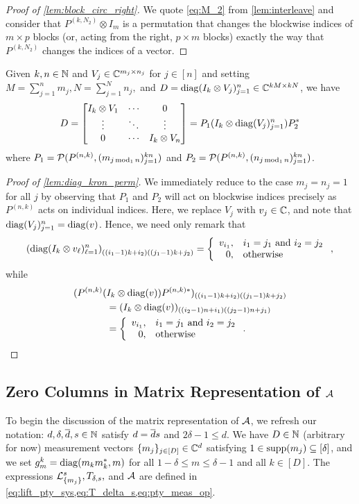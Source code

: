 \begin{proof}[Proof of \cref{lem:block_circ_right}]
  We quote \eqref{eq:M_2} from \cref{lem:interleave} and consider that $P^{(k, N_2)} \otimes I_m$ is a permutation that changes the blockwise indices of $m \times p$ blocks (or, acting from the right, $p \times m$ blocks) exactly the way that $P^{(k, N_2)}$ changes the indices of a vector.
\end{proof}

\begin{lemma} \label{lem:diag_kron_perm}
  Given $k, n \in \mathbb{N}$ and $V_j \in \mathbb{C}^{m_j \times n_j}$ for $j \in [n]$ and setting $M = \sum_{j = 1}^n m_j, N = \sum_{j = 1}^N n_j,$ and $D = \operatorname{diag}(I_k \otimes V_j)_{j = 1}^n \in \mathbb{C}^{k M \times k N}$, we have \[D =  \begin{bmatrix} I_k \otimes V_1 & \cdots & 0 \\ \vdots & \ddots & \vdots \\ 0 & \cdots & I_k \otimes V_n \end{bmatrix}  = P_1 (I_k \otimes \operatorname{diag}(V_j)_{j = 1}^n) P_2^*\] where $P_1 = \mathcal{P}(P^{(n, k)}, (m_{j \operatorname{\mathbin{mod}}_1 n})_{j = 1}^{kn})$ and $P_2 = \mathcal{P}(P^{(n, k)}, (n_{j \operatorname{\mathbin{mod}}_1 n})_{j = 1}^{kn})$.
\end{lemma}

\begin{proof}[Proof of \cref{lem:diag_kron_perm}]
  We immediately reduce to the case $m_j = n_j = 1$ for all $j$ by observing that $P_1$ and $P_2$ will act on blockwise indices precisely as $P^{(n, k)}$ acts on individual indices.  Here, we replace $V_j$ with $v_j \in \mathbb{C}$, and note that $\operatorname{diag}(V_j)_{j = 1}^n = \operatorname{diag}(v)$.  Hence, we need only remark that \[\left(\diag(I_k \otimes v_\ell)_{\ell = 1}^n\right)_{((i_1 - 1)k + i_2) ((j_1 - 1)k + j_2)} = \left\{\begin{array}{r@{,\quad}l} v_{i_1} & i_1 = j_1 \ \text{and} \ i_2 = j_2 \\ 0 & \text{otherwise} \end{array}\right.,\] while \begin{align*} (P^{(n, k)} (&I_k \otimes \diag(v)) P^{(n, k)*})_{((i_1 - 1)k + i_2) ((j_1 - 1)k + j_2)} \\ &= (I_k \otimes \diag(v))_{((i_2 - 1)n + i_1) ((j_2 - 1)n + j_1)} \\ &= \left\{\begin{array}{r@{,\quad}l} v_{i_1} & i_1 = j_1 \ \text{and} \ i_2 = j_2 \\ 0 & \text{otherwise} \end{array}\right..\end{align*}
\end{proof}

\subsection{Zero Columns in Matrix Representation of $\mathcal{A}$}
\label{sec:pty_zero_col}
To begin the discussion of the matrix representation of $\mathcal{A}$, we refresh our notation: $d, \delta, \overline{d}, s \in \mathbb{N}$ satisfy $d = \overline{d} s$ and $2 \delta - 1 \le d$.  We have $D \in \mathbb{N}$ (arbitrary for now) measurement vectors $\{m_j\}_{j \in [D]} \in \mathbb{C}^d$ satisfying $1 \in \operatorname{supp}(m_j) \subseteq [\delta]$, and we set $g_m^k = \operatorname{diag}(m_k m_k^*, m)$ for all $1 - \delta \le m \le \delta - 1$ and all $k \in [D]$.  The expressions $\mathcal{L}_{\{m_j\}}^s, T_{\delta, s},$ and $\mathcal{A}$ are defined in \cref{eq:lift_pty_sys,eq:T_delta_s,eq:pty_meas_op}.

